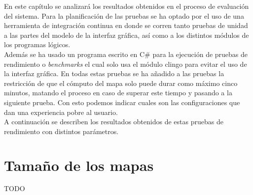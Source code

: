 En este capítulo se analizará los resultados obtenidos en el proceso de evaluación del sistema. Para la planificación de las pruebas se ha optado por el uso de una herramienta de integración continua en donde se corren tanto pruebas de unidad a las partes del modelo de la interfaz gráfica, así como a los distintos módulos de los programas lógicos. \\

Además se ha usado un programa escrito en C\# para la ejecución de pruebas de rendimiento o \textit{benchmarks} el cual solo usa el módulo clingo para evitar el uso de la interfaz gráfica. En todas estas pruebas se ha añadido a las pruebas la restricción de que el cómputo del mapa solo puede durar como máximo cinco minutos, matando el proceso en caso de superar este tiempo y pasando a la siguiente prueba. Con esto podemos indicar cuales son las configuraciones que dan una experiencia pobre al usuario. \\

A continuación se describen los resultados obtenidos de estas pruebas de rendimiento con distintos parámetros. \\

\section{Tamaño de los mapas}

TODO